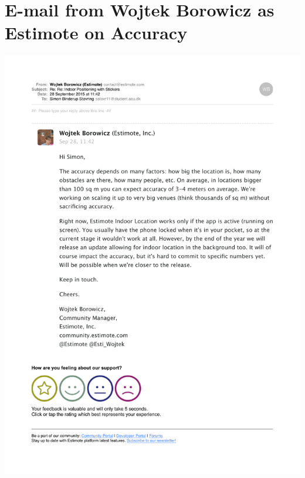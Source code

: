 \chapter{E-mail from Wojtek Borowicz as Estimote on Accuracy}
\label{appendix:estimote-accuracy}
\includegraphics[width=\textwidth]{images/estimote-accuracy-estimate-mail}